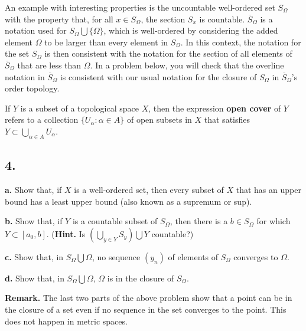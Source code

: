 \documentclass{amsart}
\theoremstyle{plain}
\theoremstyle{definition}
\theoremstyle{remark}
\begin{document}
An example with interesting properties is the uncountable well-ordered set $S_{\Omega}$ with the property that, for all $x \in S_{\Omega}$, the section $S_x$ is countable. $\overline{S} _{\Omega}$ is a notation used for $S_{\Omega} \bigcup \{ \Omega\}$, which is well-ordered by considering the added element $\Omega$ to be larger than every element in $S_{\Omega}$. In this context, the notation for the set $S_{\Omega}$ is then consistent with the notation for the section of all elements of $\overline{S} _{\Omega}$ that are less than $\Omega$. In a problem below, you will check that the overline notation in $\overline{S} _{\Omega}$ is consistent with our usual notation for the closure of $S_{\Omega}$ in $\overline{S} _{\Omega}$'s order topology. 

If $Y$ is a subset of a topological space $X$, then the expression {\bf open cover} of $Y$ refers to a collection $\{ U_{\alpha} : \alpha \in A\}$ of open subsets in $X$ that satisfies $Y\subset \bigcup _{\alpha \in A} U_{\alpha}$. 

\vspace{.15in}
\noindent
\subsection*{4.}  

\vspace{.1in}
{\bfseries a.} Show that, if $X$ is a well-ordered set, then every subset of $X$ that has an upper bound has a least upper bound (also known as a supremum or sup).

\vspace{.1in}
{\bfseries b.}  Show that, if $Y$ is a countable subset of $S_{\Omega}$, then there is a $b \in S_{\Omega}$ for which $Y \subset [a_0 , b ]$. ({\bf Hint.} Is $(\bigcup _{y\in Y} S_y)\bigcup Y$ countable?) 

\vspace{.1in}
{\bfseries c.} Show that, in $S_{\Omega} \bigcup \Omega$, no sequence $(y_n)$ of elements of $S_{\Omega}$  converges to $\Omega$.

\vspace{.1in}
{\bfseries d.} Show that, in $S_{\Omega} \bigcup \Omega$, $\Omega$ is in the closure of $S_{\Omega}$. 

\vspace{.1in} {\bf Remark.} The last two parts of the above problem show that a point can be in the closure of a set even if no sequence in the set converges to the point. This does not happen in metric spaces. 
\end{document}

